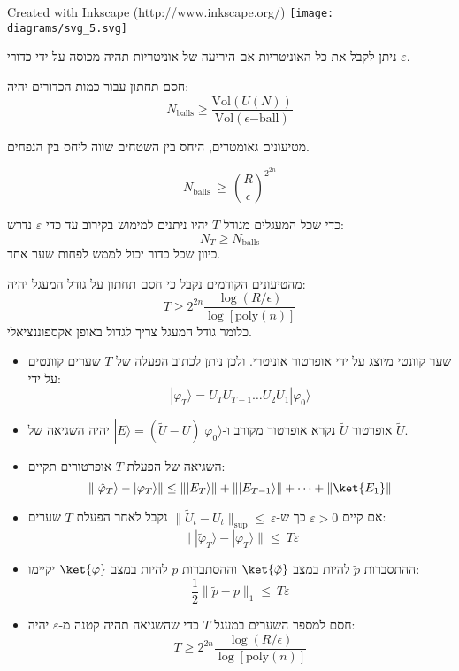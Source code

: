 \documentclass{tstextbook}
\begin{document}
 Created with Inkscape (http://www.inkscape.org/) \texttt{[image: diagrams/svg\_5.svg]}
\begin{corollary}
ניתן לקבל את כל האוניטריות אם היריעה של אוניטריות תהיה מכוסה על ידי כדורי \(\varepsilon\).

\end{corollary}
\begin{proposition}
חסם תחתון עבור כמות הכדורים יהיה:
$$N_{\mathrm{balls}}\geq{\frac{\mathrm{Vol}\left(U\left(N\right)\right)}{\mathrm{Vol}\left(\epsilon{\mathrm{-ball}}\right)}}$$

\end{proposition}
\begin{lemma}
מטיעונים גאומטרים, היחס בין השטחים שווה ליחס בין הנפחים.

\end{lemma}
\begin{corollary}
$$N_{\mathrm{balls}}\,\geq\,\left({\frac{R}{\epsilon}}\right)^{2^{2n}}$$

\end{corollary}
\begin{proposition}
כדי שכל המעגלים מגודל \(T\) יהיו ניתנים למימוש בקירוב עד כדי \(\varepsilon\) נדרש:
$$N_{T}\geq N_{\mathrm{balls}}$$
כיוון שכל כדור יכול לממש לפחות שער אחד.

\end{proposition}
\begin{corollary}
מהטיעונים הקודמים נקבל כי חסם תחתון על גודל המעגל יהיה:
$$T\geq2^{2n}\frac{\log\left(R/\epsilon\right)}{\log\left[\mathrm{poly}\left(n\right)\right]}$$
כלומר גודל המעגל צריך לגדול באופן אקספוננציאלי.

\end{corollary}
\begin{summary}
  \begin{itemize}
    \item שער קוונטי מיוצג על ידי אופרטור אוניטרי. ולכן ניתן לכתוב הפעלה של \(T\) שערים קוונטים על ידי:
$$|\varphi_{T}\rangle=U_{T}U_{T-1}\ldots U_{2}U_{1}|\varphi_{0}\rangle$$
    \item אופרטור \(\tilde{U}\) נקרא אופרטור מקורב ו-\(|E\rangle=( \widetilde{U}-U)|\varphi_{0}\rangle\) יהיה השגיאה של \(\tilde{U}\).
    \item השגיאה של הפעלת \(T\) אופרטורים תקיים:
$$\left\lVert  |\hat{\varphi}_{T}\rangle-|\varphi_{T}\rangle  \right\rVert \leq\left\lVert  |E_{T}\rangle  \right\rVert +\left\lVert  |E_{T-1}\rangle  \right\rVert +\dots+\lVert \ket{E_{1}} \rVert $$
    \item אם קיים \(\varepsilon> 0\) כך ש-\(\parallel\widetilde{U}_{t}-U_{t}\parallel_{\mathrm{sup}} \leq\ \varepsilon\) נקבל לאחר הפעלת \(T\) שערים:
$$\lVert |\tilde{\varphi}_{T}\rangle-|\varphi_{T}\rangle \rVert  \leq\ T\varepsilon$$
    \item ההתסברות \(\tilde{p}\) להיות במצב \(\ket{\tilde{\varphi}}\) וההסתברות \(p\) להיות במצב \(\ket{\varphi}\) יקיימו:
$$\frac{1}{2}\|\tilde{p}-p\|_{1}\leq~T\varepsilon$$
    \item חסם למספר השערים במעגל \(T\) כדי שהשגיאה תהיה קטנה מ-\(\varepsilon\) יהיה:
$$T\geq2^{2n}\frac{\log\left(R/\epsilon\right)}{\log\left[\mathrm{poly}\left(n\right)\right]}$$
  \end{itemize}
\end{summary}
\end{document}
